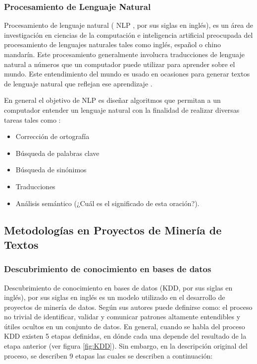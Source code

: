 \subsubsection{Procesamiento de Lenguaje Natural}
    Procesamiento de lenguaje natural ( NLP , por sus siglas en inglés), es un área de investigación en ciencias de la computación e inteligencia artificial preocupada del procesamiento de lenguajes naturales tales como inglés, español o chino mandarín. Este procesamiento generalmente involucra traducciones de lenguaje natural a números que un computador puede utilizar para aprender sobre el mundo. Este entendimiento del mundo es usado en ocasiones para generar textos de lenguaje natural que reflejan ese aprendizaje \cite{lane2019natural}. 
    
    En general el objetivo de NLP es diseñar algoritmos que permitan a un computador entender un lenguaje natural con la finalidad de realizar diversas tareas tales como \cite{NLP-DL}:
    \begin{itemize}
        \item Corrección de ortografía
        \item Búsqueda de palabras clave
        \item Búsqueda de sinónimos
        \item Traducciones
        \item Análisis semántico (¿Cuál es el significado de esta oración?).
    \end{itemize}
\subsection{Metodologías en Proyectos de Minería de Textos}
\subsubsection{Descubrimiento de conocimiento en bases de datos}
    Descubrimiento de conocimiento en bases de datos (KDD, por sus siglas en inglés), \cite{fayyad1996kdd} por sus siglas en inglés es un modelo utilizado en el desarrollo de proyectos de minería de datos. Según sus autores puede definirse como: el proceso no trivial de identificar, validar y comunicar patrones altamente entendibles y útiles ocultos en un conjunto de datos. En general, cuando se habla del proceso KDD existen 5 etapas  definidas, en dónde cada una depende del resultado de la etapa anterior (ver figura \ref{fig:KDD}). Sin embargo, en la descripción original del proceso, se describen 9 etapas las cuales se describen a continuación:

